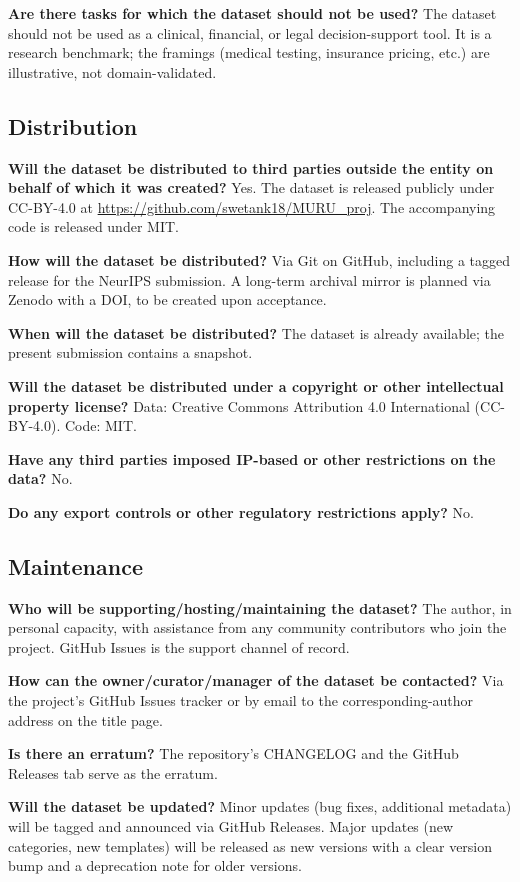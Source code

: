 \documentclass{article}
\begin{document}
\textbf{Are there tasks for which the dataset should not be used?}
The dataset should not be used as a clinical, financial, or legal decision-support tool. It is a research benchmark; the framings (medical testing, insurance pricing, etc.) are illustrative, not domain-validated.

\subsection*{Distribution}

\textbf{Will the dataset be distributed to third parties outside the entity on behalf of which it was created?}
Yes. The dataset is released publicly under CC-BY-4.0 at \url{https://github.com/swetank18/MURU_proj}. The accompanying code is released under MIT.

\textbf{How will the dataset be distributed?}
Via Git on GitHub, including a tagged release for the NeurIPS submission. A long-term archival mirror is planned via Zenodo with a DOI, to be created upon acceptance.

\textbf{When will the dataset be distributed?}
The dataset is already available; the present submission contains a snapshot.

\textbf{Will the dataset be distributed under a copyright or other intellectual property license?}
Data: Creative Commons Attribution 4.0 International (CC-BY-4.0). Code: MIT.

\textbf{Have any third parties imposed IP-based or other restrictions on the data?}
No.

\textbf{Do any export controls or other regulatory restrictions apply?}
No.

\subsection*{Maintenance}

\textbf{Who will be supporting/hosting/maintaining the dataset?}
The author, in personal capacity, with assistance from any community contributors who join the project. GitHub Issues is the support channel of record.

\textbf{How can the owner/curator/manager of the dataset be contacted?}
Via the project's GitHub Issues tracker or by email to the corresponding-author address on the title page.

\textbf{Is there an erratum?}
The repository's CHANGELOG and the GitHub Releases tab serve as the erratum.

\textbf{Will the dataset be updated?}
Minor updates (bug fixes, additional metadata) will be tagged and announced via GitHub Releases. Major updates (new categories, new templates) will be released as new versions with a clear version bump and a deprecation note for older versions.
\end{document}
